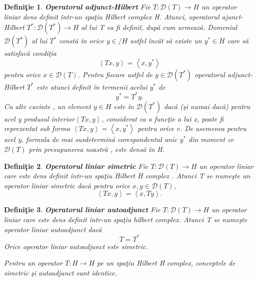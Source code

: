 \documentclass[a4paper,12pt,oneside]{report}
\newtheorem{definition}{Defini\c tie}
\begin{document}
\begin{definition} \textbf{Operatorul adjunct-Hilbert }
Fie \(T : \mathcal{D}\left ( T \right ) \rightarrow H\) un operator liniar dens definit \^{i}ntr-un spa\c{t}iu Hilbert complex H. Atunci, operatorul ajunct-Hilbert \(T^{\ast } : \mathcal{D}\left ( T^{\ast } \right ) \rightarrow H\) al lui T va fi definit, dup\u{a} cum urmeaz\u{a}. Domeniul \(\mathcal{D}\left ( T^{\ast } \right )\) al lui \(T^{\ast }\) const\u{a} \^{i}n orice \(y \in /H\) astfel \^{i}nc\^{a}t s\u{a} existe un \(y^{\ast } \in H\) care s\u{a} satisfac\u{a} condi\c{t}ia
\begin{displaymath}
\left \langle Tx,y \right \rangle = \left \langle x,y^{\ast } \right \rangle
\end{displaymath}
pentru orice \(x \in \mathcal{D}\left ( T \right )\). Pentru fiecare astfel de \(y \in \mathcal{D}\left ( T^{\ast } \right )\) operatorul adjunct-Hilbert \(T^{\ast }\) este atunci definit \^{i}n termenii acelui \(y^{\ast }\) de
\begin{displaymath}
y^{\ast } = T^{\ast }y.
\end{displaymath}
Cu alte cuvinte , un element \(y\in H\) este \^{i}n \(\mathcal{D}\left ( T^{\ast } \right )\) dac\u{a} (\c{s}i numai dac\u{a}) pentru acel y produsul interior\(\left \langle Tx,y \right \rangle \), considerat ca o func\c{t}ie a lui x, poate fi reprezentat sub forma  \(\left \langle Tx,y \right \rangle = \left \langle x,y^{\ast } \right \rangle\) pentru orice \(v\). De asemenea pentru acel y, formula de mai susdetermin\u{a} corespondentul unic \(y^{\ast }\) din moment ce \(\mathcal{D}\left ( T \right )\) prin presupunerea noastr\u{a} , este dens\u{a} \^{i}n H.
\end{definition}
\begin{definition}\textbf{Operatorul liniar simetric }
Fie \(T :  \mathcal{D}\left ( T \right ) \rightarrow H\) un operator liniar care este dens definit \^{i}ntr-un spa\c{t}iu Hilbert H complex . Atunci T se nume\c{s}te un operator liniar simetric dac\u{a} pentru orice \(x,y\in \mathcal{D}\left ( T \right )\), 
\begin{displaymath}
\left \langle Tx,y \right \rangle = \left \langle x,Ty \right \rangle. 
\end{displaymath}
\end{definition}
\begin{definition}\textbf{Operatorul liniar autoadjunct}
Fie \(T :  \mathcal{D}\left ( T \right ) \rightarrow H \) un operator liniar care este dens definit \^{i}ntr-un spa\c{t}iu hilbert complex. Atunci T se nume\c{s}te operator liniar autoadjunct dac\u{a}
\begin{displaymath}
T = T^{\ast }
\end{displaymath}
Orice operator liniar autoadjunct este simetric. 

\noindent Pentru un operator \(T : H \rightarrow H\) pe un spa\c{t}iu Hilbert H complex, conceptele de simetric \c{s}i autoadjunct sunt identice. 
\end{definition}
\end{document}
